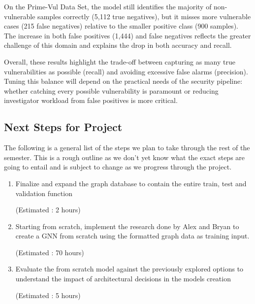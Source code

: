 \documentclass{article}
\begin{document}
On the Prime-Vul Data Set, the model still identifies the majority of non-vulnerable samples correctly (5,112 true negatives), but it misses more vulnerable cases (215 false negatives) relative to the smaller positive class (900 samples). The increase in both false positives (1,444) and false negatives reflects the greater challenge of this domain and explains the drop in both accuracy and recall.

Overall, these results highlight the trade-off between capturing as many true vulnerabilities as possible (recall) and avoiding excessive false alarms (precision). Tuning this balance will depend on the practical needs of the security pipeline: whether catching every possible vulnerability is paramount or reducing investigator workload from false positives is more critical.


\subsection{Next Steps for Project}
The following is a general list of the steps we plan to take through the rest of the semester.
This is a rough outline as we don't yet know what the exact steps are going to entail and is subject to change as we progress through the project.

\begin{enumerate}
    \item Finalize and expand the graph database to contain the entire train, test and validation function
      
      (Estimated : 2 hours)
    \item Starting from scratch, implement the research done by Alex and Bryan to create a GNN from scratch using the formatted graph data as training input.

      (Estimated : 70 hours)

    \item Evaluate the from scratch model against the previously explored options to understand the impact
      of architectural decisions in the models creation

      (Estimated : 5 hours)
\end{enumerate}
\end{document}
